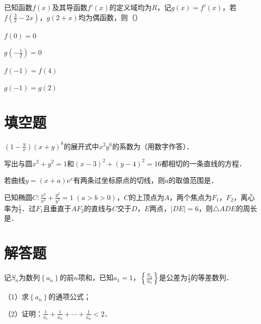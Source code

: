 \documentclass[fontset=founder]{ucedubook}
\begin{document}
\begin{ti}
已知函数$f(x)$及其导函数$f'(x)$的定义域均为$R$，记$g(x) = f'(x)$，若$f\left( \frac{3}{2} - 2x \right)$，$g(2 + x)$均为偶函数，则（\qquad）

\begin{choices}
  \item $f(0) = 0$
  \item $g\left( - \frac{1}{2} \right) = 0$
  \item $f( - 1) = f(4)$
  \item $g( - 1) = g(2)$
\end{choices}
\end{ti}


\newpageb
\section{填空题}

\begin{ti}
$\left( 1 - \frac{y}{x} \right){(x + y)}^{8}$的展开式中$x^{2}y^{6}$的系数为\kong[8]（用数字作答）．
\end{ti}


\begin{ti}
写出与圆$x^{2} + y^{2} = 1$和${(x - 3)}^{2} + {(y - 4)}^{2} = 16$都相切的一条直线的方程\kong[8]．
\end{ti}


\begin{ti}
若曲线$y = (x + a)\mathrm{e}^{x}$有两条过坐标原点的切线，则$a$的取值范围是\kong[8]．
\end{ti}


\begin{ti}
已知椭圆$C:\frac{x^{2}}{a^{2}} + \frac{y^{2}}{b^{2}} = 1\;(a > b > 0)$，$C$的上顶点为$A$，两个焦点为$F_{1}$，$F_{2}$，离心率为$\frac{1}{2}$．过$F_{1}$且垂直于$AF_{2}$的直线与$C$交于$D$，$E$两点，$|DE| = 6$，则$\triangle ADE$的周长是\kong[8]．
\end{ti}


\newpageb
\section{解答题}

\begin{ti}[.5]
记$S_{n}$为数列$\left\{ a_{n} \right\}$的前$n$项和，已知$a_{1} = 1$，$\left\{ \frac{S_{n}}{a_{n}} \right\}$是公差为$\frac{1}{3}$的等差数列．

（1）求$\left\{ a_{n} \right\}$的通项公式；

（2）证明：$\frac{1}{a_{1}} + \frac{1}{a_{2}} + \cdots + \frac{1}{a_{n}} < 2$．
\end{ti}
\end{document}
